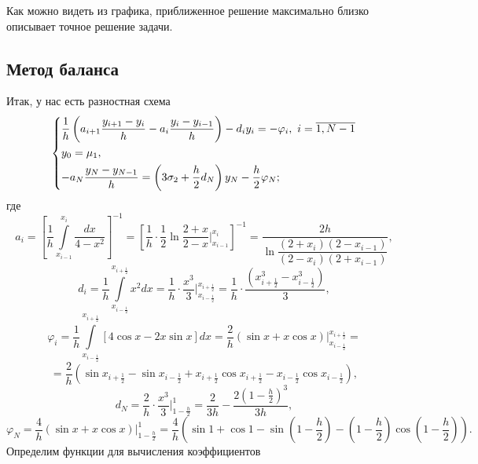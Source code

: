 \documentclass[a4paper, 12pt]{article}
\begin{document}
    Как можно видеть из графика, приближенное решение максимально близко
описывает точное решение задачи.

    \hypertarget{ux43cux435ux442ux43eux434-ux431ux430ux43bux430ux43dux441ux430}{%
\subsection{Метод
баланса}\label{ux43cux435ux442ux43eux434-ux431ux430ux43bux430ux43dux441ux430}}

    Итак, у нас есть разностная схема \[
\begin{dcases}
            \dfrac{1}{h}\left(a_{i+1}\dfrac{y_{i+1} - y_i}{h} - a_i \dfrac{y_i - y_{i-1}}{h}\right)-d_iy_i = -\varphi_i,\ i=\overline {1,N-1}\\
            y_0 = \mu_1,\\
            -a_N \dfrac{y_N - y_{N-1}}{h} = \left(3\sigma_2 + \dfrac h2 d_N\right)y_N - \dfrac h2 \varphi_N;
        \end{dcases}
\] где
\[a_i = \left[ \dfrac 1h \int\limits_{x_{i-1}}^{x_i} \dfrac{dx}{4-x^2}\right]^{-1} = \left[ \dfrac 1h\cdot \dfrac 12 \ln \dfrac{2+x}{2-x}\Big|_{x_{i-1}}^{x_i}\right]^{-1} = \dfrac{2h}{\ln \dfrac{(2+x_i)(2-x_{i-1})}{(2-x_i)(2+x_{i-1})}},\]
\[d_i=\dfrac 1h \int\limits_{x_{i-\frac12}}^{x_{i+\frac12}} x^2 dx = \dfrac 1 h\cdot \dfrac {x^3}{3}\Big | _{x_{i-\frac12}}^{x_{i+\frac12}}=\dfrac 1h\cdot \dfrac{(x_{i+\frac12}^3 - x_{i - \frac 12}^3)}{3},\]
\[\varphi_i = \dfrac{1}{h} \int\limits_{x_{i-\frac12}}^{x_{i+\frac12}}[4\cos x - 2 x \sin x]dx = \dfrac 2 h (\sin x  + x \cos x)\Big | _{x_{i-\frac12}}^{x_{i+\frac12}}=\]
\[= \dfrac 2 h (\sin x_{i+\frac 12} - \sin x_{i-\frac 12} + x_{i+\frac 12}\cos x_{i+\frac 12} - x_{i-\frac 12}\cos x_{i-\frac 12}),\]
\[d_N = \dfrac 2 h\cdot \dfrac {x^3}{3}\Big | _{1-\frac h 2}^{1} = \dfrac {2}{3h} - \dfrac{2 \left(1 - \frac h2\right)^3}{3h},\]
\[\varphi_N = \dfrac 4 h (\sin x  + x \cos x)\Big | _{1-\frac h2}^{1} = \dfrac 4 h \left(\sin 1 + \cos 1 - \sin \left(1-\dfrac h 2\right)- \left(1-\dfrac h 2\right) \cos \left(1-\dfrac h 2\right)\right).\]
Определим функции для вычисления коэффициентов
\end{document}
